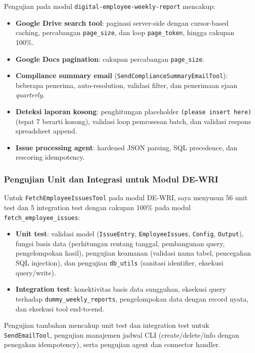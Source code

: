 Pengujian pada modul \texttt{digital-employee-weekly-report} mencakup:

\begin{itemize}
    \item \textbf{Google Drive search tool}: paginasi server-side dengan cursor-based caching, percabangan \texttt{page\_size}, dan loop \texttt{page\_token}, hingga cakupan 100\%.
    \item \textbf{Google Docs pagination}: cakupan percabangan \texttt{page\_size}.
    \item \textbf{Compliance summary email} (\texttt{SendComplianceSummaryEmailTool}): beberapa penerima, auto-resolution, validasi filter, dan penerimaan ejaan \textit{quarterly}.
    \item \textbf{Deteksi laporan kosong}: penghitungan placeholder \texttt{(please insert here)} (tepat 7 berarti kosong), validasi loop pemrosesan batch, dan validasi respons spreadsheet append.
    \item \textbf{Issue processing agent}: hardened JSON parsing, SQL precedence, dan rescoring idempotency.
\end{itemize}

\subsubsection{Pengujian Unit dan Integrasi untuk Modul DE-WRI}

Untuk \texttt{FetchEmployeeIssuesTool} pada modul DE-WRI, saya menyusun 56 unit test dan 5 integration test dengan cakupan 100\% pada modul \texttt{fetch\_employee\_issues}:

\begin{itemize}
    \item \textbf{Unit test}: validasi model (\texttt{IssueEntry}, \texttt{EmployeeIssues}, \texttt{Config}, \texttt{Output}), fungsi basis data (perhitungan rentang tanggal, pembangunan query, pengelompokan hasil), pengujian keamanan (validasi nama tabel, pencegahan SQL injection), dan pengujian \texttt{db\_utils} (sanitasi identifier, eksekusi query/write).
    \item \textbf{Integration test}: konektivitas basis data sungguhan, eksekusi query terhadap \texttt{dummy\_weekly\_reports}, pengelompokan data dengan record nyata, dan eksekusi tool end-to-end.
\end{itemize}

Pengujian tambahan mencakup unit test dan integration test untuk \texttt{SendEmailTool}, pengujian manajemen jadwal CLI (create/delete/info dengan penegakan idempotency), serta pengujian agent dan connector handler.

